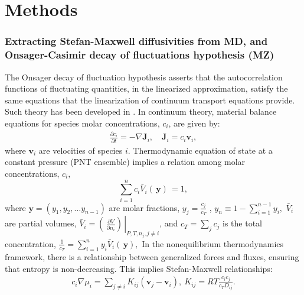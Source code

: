 \documentclass[../main.tex]{subfiles}
\begin{document}
\section{Methods}
\subsubsection{Extracting Stefan-Maxwell diffusivities from MD, and Onsager-Casimir decay of fluctuations hypothesis (MZ)}
\label{sec:stefan-maxwell}

The Onsager decay of fluctuation hypothesis asserts that the autocorrelation functions of fluctuating quantities, in the linearized approximation, satisfy the same equations that the linearization of continuum transport equations provide. Such theory has been developed in \cite{mwn2006,mwn2009,mwn2015}. In continuum theory, material balance equations for species molar concentrations, $c_i$, are given by:
\begin{equation} \begin{array}{l}
 \frac{\partial c_i}{\partial t} = - \nabla \mathbf{J}_i  , \quad
    \mathbf{J}_i  = c_i \mathbf{v}_i ,
    \label{massbalance}
\end{array} \end{equation}
\noindent where $\mathbf{v}_i$ are velocities of species $i$. Thermodynamic equation of state at a constant pressure (PNT ensemble) implies\cite{GoyalMonroe} a relation among molar concentrations, $c_i,$
\begin{equation}
    \sum_{i=1}^n c_i \bar{V}_i ( \, \mathbf{y} ) \, =1,
\end{equation}
\noindent where $\mathbf{y} = (y_1, y_2, \ldots y_{n-1})$ are molar fractions,  $y_j = \frac{c_j}{c_T}$ , $y_n \equiv 1-\sum_{i=1}^{n-1} y_i,$  $\bar{V}_i$ are partial volumes, $\bar{V}_i = \left. \left(\, \frac{\partial V}{\partial n_i} \right)\, \right\vert_{P,T, n_j,j\neq i}$,  and $c_T = \sum_j c_j$ is the total concentration, $\frac{1}{c_T} = \sum_{i=1}^n y_i \bar{V}_i ( \, \mathbf{y} )\label{cT},$ In the nonequilibrium thermodynamics framework\cite{GoyalMonroe}, there is a relationship between generalized forces and fluxes, ensuring that entropy is non-decreasing. %
This implies Stefan-Maxwell relationships:
\begin{equation} \begin{array}{l}
    \displaystyle c_i \nabla \mu_i = \displaystyle \sum_{j\neq i}  K_{ij} (\mathbf{v}_j - \mathbf{v}_i), \
    K_{ij}= R  T  \frac{c_i c_j }{c_T D_{ij}}.
    \label{StM:K}
\end{array} \end{equation}
\end{document}
